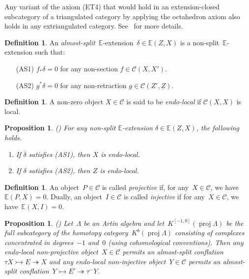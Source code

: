 \documentclass{amsart}
\newtheorem{proposition}[theorem]{Proposition}
\theoremstyle{definition}
\newtheorem{definition}[theorem]{Definition}
\newcommand{\darkblue}{\color{darkblue}} %
\newcommand{\defn}[1]{\textsl{\darkblue #1}} %
\newcommand{\cat}{\mathcal{C}}
\newcommand{\proj}{\operatorname{proj}}
\newcommand{\infl}{\rightarrowtail}
\newcommand{\defl}{\twoheadrightarrow}
\begin{document}
Any variant of the axiom (ET4) that would hold in an extension-closed subcategory of a triangulated category by applying the octahedron axiom also holds in any extriangulated category.
See~\cite[Section 3.2]{NakaokaPalu} for more details.


\begin{definition}
An \defn{almost-split}~$\mathbb{E}$-extension~$\delta\in\mathbb{E}(Z,X)$ is a non-split~$\mathbb{E}$-extension such that:
\begin{itemize}
\item[{\rm (AS1)}] $f_\ast\delta=0$ for any non-section $f\in\cat(X,X')$.
\item[{\rm (AS2)}] $g^\ast\delta=0$ for any non-retraction $g\in\cat(Z',Z)$.
\end{itemize}
\end{definition}

\begin{definition}
A non-zero object $X\in\cat$ is said to be \defn{endo-local} if $\cat(X,X)$ is local.
\end{definition}

\begin{proposition}\emph{(}\cite[Proposition 2.5]{IyamaNakaokaPalu}\emph{)}
For any non-split $\mathbb{E}$-extension $\delta\in\mathbb{E}(Z,X)$, the following holds.
\begin{enumerate}[{\rm (1)}]
\item If $\delta$ satisfies {\rm (AS1)}, then $X$ is endo-local.
\item If $\delta$ satisfies {\rm (AS2)}, then $Z$ is endo-local.
\end{enumerate}
\end{proposition}

\begin{definition}
 An object~$P\in\cat$ is called \defn{projective} if, for any~$X\in\cat$, we have~$\mathbb{E}(P,X)=0$.
 Dually, an object~$I\in\cat$ is called \defn{injective} if for any~$X\in\cat$, we have~$\mathbb{E}(X,I)=0$.
\end{definition}

\begin{proposition}\emph{(}\cite[Proposition 8.1]{IyamaNakaokaPalu}\emph{)}
Let~$\Lambda$ be an Artin algebra and let~$K^{[-1,0]}(\proj\Lambda)$ be the full subcategory of the homotopy category~$K^b(\proj\Lambda)$ consisting of complexes concentrated in degrees~$-1$ and~$0$ (using cohomological conventions).
Then any endo-local non-projective object~$X\in\cat$ permits an almost-split conflation~$\tau X\infl E\defl X$ and any endo-local non-injective object~$Y\in\cat$ permits an almost-split conflation~$Y\infl E'\defl \tau^- Y$.
\end{proposition}
\end{document}

